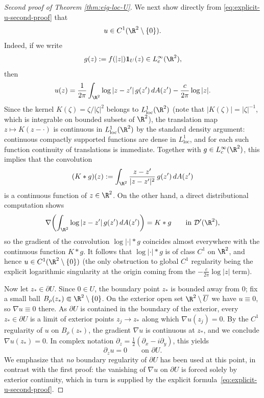 \begin{proof}[Second proof of Theorem \ref{thm:eig-loc-U}]
We next show directly from \eqref{eq:explicit-u-second-proof} that
\[
u\in C^1(\R^2\setminus\{0\}).
\]
Indeed, if we write
\[
g(z):=f(|z|)\mathbf{1}_U(z)\in L^\infty_c(\R^2),
\]
then
\[
u(z)=\frac{1}{2\pi}\int_{\R^2}\log|z-z'|\,g(z')\,dA(z')-\frac{c}{2\pi}\log|z|.
\]
Since the kernel \(K(\zeta)=\zeta/|\zeta|^2\) belongs to \(L^1_{\mathrm{loc}}(\R^2)\) (note that
\(|K(\zeta)|=|\zeta|^{-1}\), which is integrable on bounded subsets of \(\R^2\)), the translation
map \(z\mapsto K(z-\cdot)\) is continuous in \(L^1_{\mathrm{loc}}(\R^2)\) by the standard density
argument: continuous compactly supported functions are dense in \(L^1_{\mathrm{loc}}\), and for
each such function continuity of translations is immediate. Together with \(g\in L^\infty_c(\R^2)\),
this implies that the convolution
\[
(K\ast g)(z):=\int_{\R^2}\frac{z-z'}{|z-z'|^2}\,g(z')\,dA(z')
\]
is a continuous function of \(z\in\R^2\). On the other hand, a direct distributional computation
shows
\[
\nabla\!\left(\int_{\R^2}\log|z-z'|\,g(z')\,dA(z')\right)=K\ast g
\qquad\text{in }\mathcal D'(\R^2),
\]
so the gradient of the convolution \(\log|\cdot|\ast g\) coincides almost everywhere with the
continuous function \(K\ast g\). It follows that \(\log|\cdot|\ast g\) is of class \(C^1\) on
\(\R^2\), and hence \(u\in C^1(\R^2\setminus\{0\})\) (the only obstruction to global \(C^1\)
regularity being the explicit logarithmic singularity at the origin coming from the
\(-\frac{c}{2\pi}\log|z|\) term).

Now let \(z_*\in\partial U\). Since \(0\in U\), the boundary point \(z_*\) is bounded away from
\(0\); fix a small ball \(B_\rho(z_*)\Subset \R^2\setminus\{0\}\). On the exterior open set
\(\R^2\setminus \overline U\) we have \(u\equiv 0\), so \(\nabla u\equiv 0\) there. As
\(\partial U\) is contained in the boundary of the exterior, every \(z_*\in\partial U\) is a limit
of exterior points \(z_j\to z_*\) along which \(\nabla u(z_j)=0\). By the \(C^1\) regularity of
\(u\) on \(B_\rho(z_*)\), the gradient \(\nabla u\) is continuous at \(z_*\), and we conclude
\(\nabla u(z_*)=0\). In complex notation \(\partial_z=\tfrac{1}{2}(\partial_x-i\partial_y)\), this
yields
\begin{equation}\label{eq:dz-zero-second-proof}
\partial_z u=0
\qquad\text{on }\partial U.
\end{equation}
We emphasize that \emph{no} boundary regularity of \(\partial U\) has been used at this point, in
contrast with the first proof: the vanishing of \(\nabla u\) on \(\partial U\) is forced solely by
exterior continuity, which in turn is supplied by the explicit
formula~\eqref{eq:explicit-u-second-proof}.


\end{proof}
